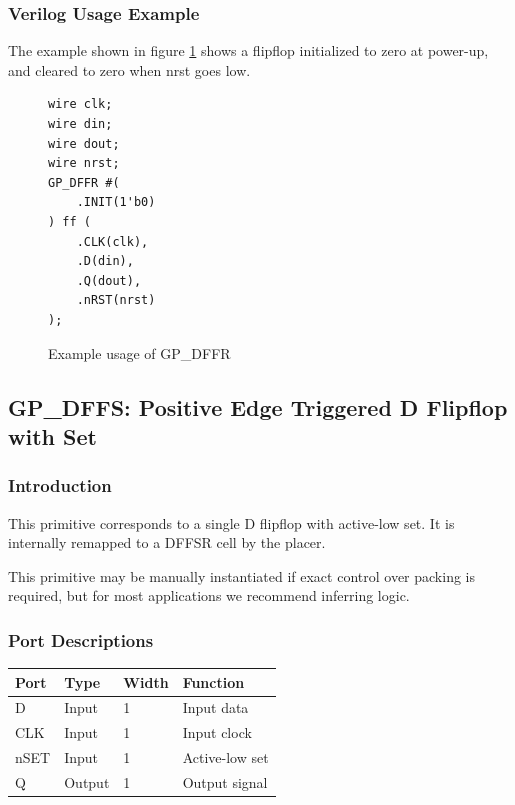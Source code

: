 \documentclass[11pt]{article}
\begin{document}
\subsubsection{Verilog Usage Example}

The example shown in figure \ref{gp-dffr-example} shows a flipflop initialized to zero at power-up, and cleared to zero 
when nrst goes low.

\begin{figure}[h]
\begin{lstlisting}
wire clk;
wire din;
wire dout;
wire nrst;
GP_DFFR #(
	.INIT(1'b0)
) ff (
	.CLK(clk),
	.D(din),
	.Q(dout),
	.nRST(nrst)
);
\end{lstlisting}
\caption{Example usage of GP\_DFFR}
\label{gp-dffr-example}
\end{figure}


\pagebreak
\subsection{GP\_DFFS: Positive Edge Triggered D Flipflop with Set}

\subsubsection{Introduction}
This primitive corresponds to a single D flipflop with active-low set. It is internally remapped to a DFFSR cell by 
the placer.

This primitive may be manually instantiated if exact control over packing is required, but for most applications we 
recommend inferring logic.

\subsubsection{Port Descriptions}

\begin{tabularx}{4in}{|l|l|l|X|}
\hline
{\bfseries Port} & {\bfseries Type} & {\bfseries Width} & {\bfseries Function} \\
\hline
D & Input & 1 & Input data \\
\hline
CLK & Input & 1 & Input clock \\
\hline
nSET & Input & 1 & Active-low set \\
\hline
Q & Output & 1 & Output signal \\
\hline
\end{tabularx}
\end{document}
